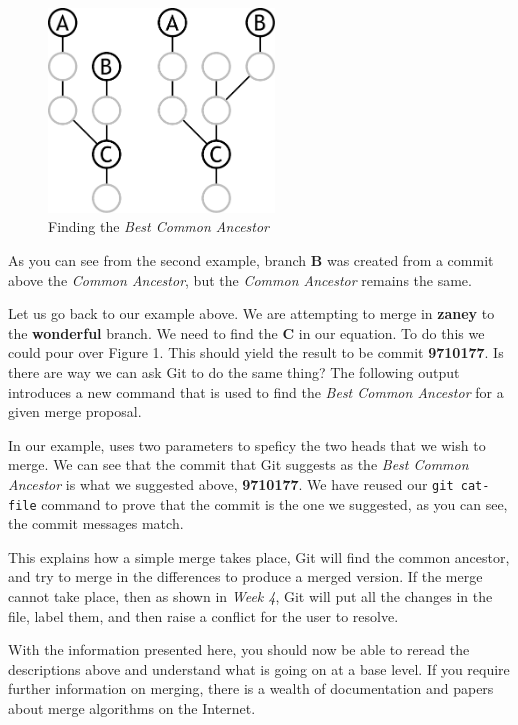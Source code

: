 \begin{figure}[hbt]
\centering
\includegraphics[width=6cm]{images/f-af4-d2.pdf}
\caption{Finding the \emph{Best Common Ancestor}}
\end{figure}

As you can see from the second example, branch \textbf{B} was created from a commit above the \emph{Common Ancestor}, but the \emph{Common Ancestor} remains the same.

Let us go back to our example above.
We are attempting to merge in \textbf{zaney} to the \textbf{wonderful} branch.
We need to find the \textbf{C} in our equation.
To do this we could pour over Figure 1.
This should yield the result to be commit \textbf{9710177}.
Is there are way we can ask Git to do the same thing? The following output introduces a new command that is used to find the \emph{Best Common Ancestor} for a given merge proposal.


In our example,  uses two parameters to speficy the two heads that we wish to merge.
We can see that the commit that Git suggests as the \emph{Best Common Ancestor} is what we suggested above, \textbf{9710177}.
We have reused our \texttt{git cat-file} command to prove that the commit is the one we suggested, as you can see, the commit messages match.

This explains how a simple merge takes place, Git will find the common ancestor, and try to merge in the differences to produce a merged version.
If the merge cannot take place, then as shown in \emph{Week 4}, Git will put all the changes in the file, label them, and then raise a conflict for the user to resolve.

With the information presented here, you should now be able to reread the descriptions above and understand what is going on at a base level.
If you require further information on merging, there is a wealth of documentation and papers about merge algorithms on the Internet.

